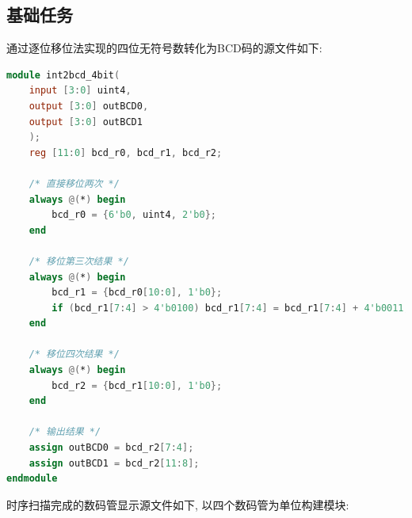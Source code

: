 \documentclass{article}
\begin{document}
\subsection*{基础任务}
通过逐位移位法实现的四位无符号数转化为BCD码的源文件如下:
\begin{lstlisting}[language=Verilog, caption={二进制转BCD}]
module int2bcd_4bit(
    input [3:0] uint4,
    output [3:0] outBCD0,
    output [3:0] outBCD1
    );
    reg [11:0] bcd_r0, bcd_r1, bcd_r2;

    /* 直接移位两次 */
    always @(*) begin
        bcd_r0 = {6'b0, uint4, 2'b0};
    end

    /* 移位第三次结果 */
    always @(*) begin
        bcd_r1 = {bcd_r0[10:0], 1'b0};
        if (bcd_r1[7:4] > 4'b0100) bcd_r1[7:4] = bcd_r1[7:4] + 4'b0011;
    end
    
    /* 移位四次结果 */
    always @(*) begin
        bcd_r2 = {bcd_r1[10:0], 1'b0};
    end
    
    /* 输出结果 */
    assign outBCD0 = bcd_r2[7:4];
    assign outBCD1 = bcd_r2[11:8];
endmodule
\end{lstlisting}
时序扫描完成的数码管显示源文件如下, 以四个数码管为单位构建模块:
\end{document}
